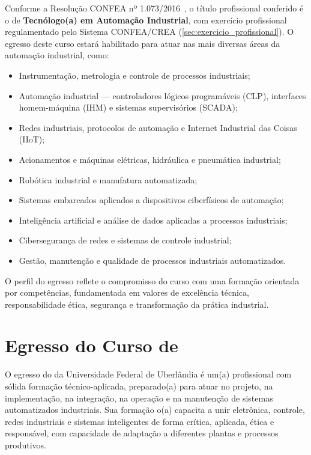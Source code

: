 Conforme a Resolução CONFEA nº 1.073/2016~\cite{confea_1073_2016}, o título profissional conferido é o de \textbf{Tecnólogo(a) em Automação Industrial}, com exercício profissional regulamentado pelo Sistema CONFEA/CREA (\autoref{sec:exercicio_profissional}). O egresso deste curso estará habilitado para atuar nas mais diversas áreas da automação industrial, como:

\begin{itemize}
    \item Instrumentação, metrologia e controle de processos industriais;
    \item Automação industrial — controladores lógicos programáveis (CLP), interfaces homem-máquina (IHM) e sistemas supervisórios (SCADA);
    \item Redes industriais, protocolos de automação e Internet Industrial das Coisas (IIoT);
    \item Acionamentos e máquinas elétricas, hidráulica e pneumática industrial;
    \item Robótica industrial e manufatura automatizada;
    \item Sistemas embarcados aplicados a dispositivos ciberfísicos de automação;
    \item Inteligência artificial e análise de dados aplicadas a processos industriais;
    \item Cibersegurança de redes e sistemas de controle industrial;
    \item Gestão, manutenção e qualidade de processos industriais automatizados.
\end{itemize}

O perfil do egresso reflete o compromisso do curso com uma formação orientada por competências, fundamentada em valores de excelência técnica, responsabilidade ética, segurança e transformação da prática industrial.

\section{Egresso do Curso de \ppccurso}

O egresso do \ppccurso da Universidade Federal de Uberlândia é um(a) profissional com sólida formação técnico-aplicada, preparado(a) para atuar no projeto, na implementação, na integração, na operação e na manutenção de sistemas automatizados industriais. Sua formação o(a) capacita a unir eletrônica, controle, redes industriais e sistemas inteligentes de forma crítica, aplicada, ética e responsável, com capacidade de adaptação a diferentes plantas e processos produtivos.

